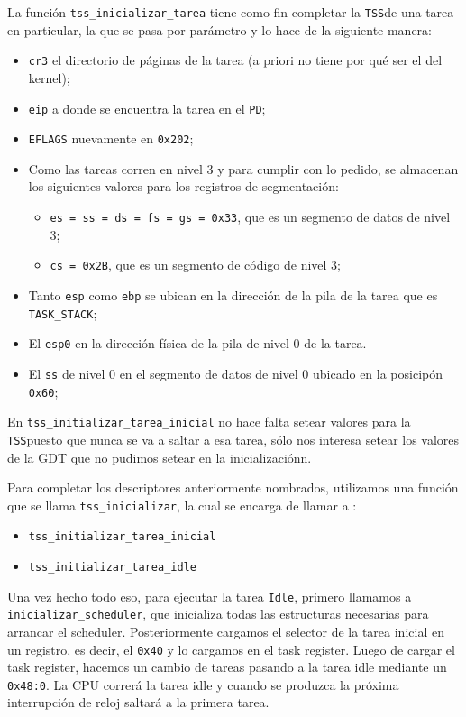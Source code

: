\documentclass[twocolumn,10pt]{article}
\newcommand{\TSS}{\texttt{TSS}}
\newcommand{\PD}{\texttt{PD}}
\begin{document}
La función \texttt{tss\_inicializar\_tarea} tiene como fin completar
la \TSS de una tarea en particular, la que se pasa por parámetro y lo
hace de la siguiente manera:
\begin{itemize}
\item \texttt{cr3} el directorio de páginas de la tarea (a priori no
  tiene por qué ser el del kernel);
\item \texttt{eip} a donde se encuentra la
  tarea en el \PD;
\item \texttt{EFLAGS} nuevamente en \texttt{0x202};
\item Como las tareas corren en nivel 3 y para cumplir con lo
  pedido, se almacenan los siguientes valores para los registros de
  segmentación:
  \begin{itemize}
  \item \texttt{es = ss = ds = fs = gs = 0x33}, que es un
    segmento de datos de nivel 3;
  \item \texttt{cs = 0x2B}, que es un segmento de código de nivel
    3;
  \end{itemize}
\item Tanto \texttt{esp} como \texttt{ebp} se ubican en la dirección de la pila
  de la tarea que es \texttt{TASK\_STACK};
\item El \texttt{esp0} en la dirección física de la pila de nivel 0 de
  la tarea.
\item El \texttt{ss} de nivel 0 en el segmento de datos de nivel 0 ubicado en
  la posicipón \texttt{0x60};
\end{itemize}

En \texttt{tss\_initializar\_tarea\_inicial} no hace falta setear
valores para la \TSS puesto que nunca se va a saltar a esa
tarea, sólo nos interesa setear los valores de la GDT que no pudimos
setear en la inicializaciónn.

Para completar los descriptores anteriormente nombrados,
utilizamos una función que se llama \texttt{tss\_inicializar}, la cual se
encarga de llamar a :
\begin{itemize}
\item \texttt{tss\_initializar\_tarea\_inicial}
\item \texttt{tss\_initializar\_tarea\_idle}
\end{itemize}

Una vez hecho todo eso, para ejecutar la tarea \texttt{Idle}, primero
llamamos a \texttt{inicializar\_scheduler}, que inicializa todas las
estructuras necesarias para arrancar el scheduler. Posteriormente
cargamos el selector de la tarea inicial en un registro, es decir, el
\texttt{0x40} y lo cargamos en el task register. Luego de cargar el
task register, hacemos un cambio de tareas pasando a la tarea idle
mediante un \texttt{0x48:0}. La CPU correrá la tarea idle y cuando se
produzca la próxima interrupción de reloj saltará a la primera tarea.
\end{document}
